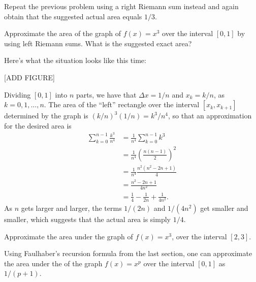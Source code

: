 \documentclass[nooutcomes]{ximera}
\begin{document}
\begin{exploration}
  Repeat the previous problem using a right Riemann sum instead and again obtain that the suggested actual area equals $1/3$.
\end{exploration}

\begin{example}
  Approximate the area of the graph of $f(x) = x^3$ over the interval $[0,1]$ by using left Riemann sums. What is the suggested exact area?

  \begin{explanation}
    Here's what the situation looks like this time:

    [ADD FIGURE]

    Dividing $[0,1]$ into $n$ parts, we have that $\Delta x = 1/n$ and $x_k = k/n$, as $k=0,1,\ldots, n$. The area of the ``left'' rectangle over the interval $[x_k,x_{k+1}]$ determined by the graph is $(k/n)^3(1/n) = k^3/n^4$, so that an approximation for the desired area is
    \begin{align*}
      \sum_{k=0}^{n-1}\frac{k^3}{n^4} &= \frac{1}{n^4}\sum_{k=0}^{n-1} k^3 \\ &= \frac{1}{n^4} \left(\frac{n(n-1)}{2}\right)^2 \\ &= \frac{1}{n^4} \frac{n^2(n^2-2n+1)}{4} \\ &= \frac{n^2-2n+1}{4n^2} \\ &= \frac{1}{4} -\frac{1}{2n} + \frac{1}{4n^2}.
    \end{align*}
As $n$ gets larger and larger, the terms $1/(2n)$ and $1/(4n^2)$ get smaller and smaller, which suggests that the actual area is simply $1/4$.
  \end{explanation}
\end{example}

\begin{exploration}
  Approximate the area under the graph of $f(x)=x^3$, over the interval $[2,3]$.
\end{exploration}

Using Faulhaber's recursion formula from the last section, one can approximate the area under the of the graph $f(x) = x^p$ over the interval $[0,1]$ as $1/(p+1)$.
\end{document}
